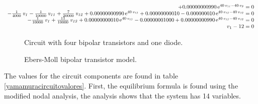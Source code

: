 \documentclass[conference,letterpaper,onecolumn]{IEEEtran}
\begin{document}
{\begin{equation}
\begin{array}{r}
+ 0.00000000990\,{{\rm e}^{40\,{\it v_{11}}-40\,{\it v_9}}}=0 \\
-{\frac {1}{4000}}\,{\it v_1}-{\frac {1}{10000}}\,{\it v_{11}}+{\frac {7}{
20000}}\,{\it v_{12}}+ 0.00000000990\,{{\rm e}^{40\,{\it v_{13}}}}+
 0.00000000010- 0.000000010\,{{\rm e}^{40\,{\it v_{13}}-40\,{\it v_{12}}}}=0 \\
-{\frac {1}{10000}}\,{\it v_1}+{\frac {11}{10000}}\,{\it v_{13}}+
 0.00000000010\,{{\rm e}^{40\,{\it v_{13}}}}- 0.00000001000+
 0.00000000990\,{{\rm e}^{40\,{\it v_{13}}-40\,{\it v_{12}}}}=0 \\
 v_1-12=0\\
\end{array}
\label{eqsd}
\end{equation}}

\begin{figure}[tbp]
\centerline{
\epsfxsize=100mm
}
\caption{Circuit with four bipolar transistors and one diode.}
\label{yamamuracircuito}
\end{figure}

\begin{figure}[hbtp]
\centerline{
\epsfxsize=26mm
}
\caption{Ebers-Moll bipolar transistor model.}
\label{FEbersMoll}
\end{figure}

The values for the circuit components are found in table \ref{yamamuracircuitovalores}. First, the equilibrium formula is found using the modified nodal analysis, the analysis shows that the system has 14 variables.

\begin{table}[hbtp]
\caption{Values for the resistors employed.}
\label{yamamuracircuitovalores}
\end{table}
\end{document}
